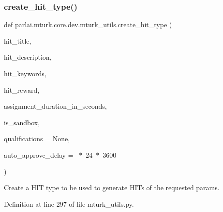 \subsubsection{\texorpdfstring{create\+\_\+hit\+\_\+type()}{create\_hit\_type()}}
{\footnotesize\ttfamily def parlai.\+mturk.\+core.\+dev.\+mturk\+\_\+utils.\+create\+\_\+hit\+\_\+type (\begin{DoxyParamCaption}\item[{}]{hit\+\_\+title,  }\item[{}]{hit\+\_\+description,  }\item[{}]{hit\+\_\+keywords,  }\item[{}]{hit\+\_\+reward,  }\item[{}]{assignment\+\_\+duration\+\_\+in\+\_\+seconds,  }\item[{}]{is\+\_\+sandbox,  }\item[{}]{qualifications = {\ttfamily None},  }\item[{}]{auto\+\_\+approve\+\_\+delay = {~$\ast$~24~$\ast$~3600} }\end{DoxyParamCaption})}

\begin{DoxyVerb}Create a HIT type to be used to generate HITs of the requested params.
\end{DoxyVerb}
 

Definition at line 297 of file mturk\+\_\+utils.\+py.


